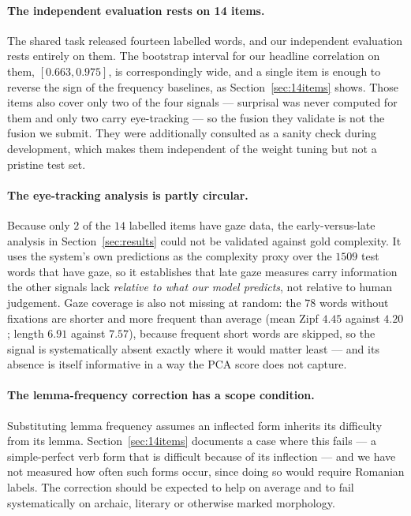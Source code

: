 \paragraph{The independent evaluation rests on 14 items.}
The shared task released fourteen labelled words, and our independent
evaluation rests entirely on them. The bootstrap interval for our headline
correlation on them, $[0.663, 0.975]$, is correspondingly wide, and a
single item is enough to reverse the sign of the frequency baselines,
as Section~\ref{sec:14items} shows. Those items also cover only two of
the four signals --- surprisal was never computed for them and only two
carry eye-tracking --- so the fusion they validate is not the fusion we
submit. They were additionally consulted as a sanity check during
development, which makes them independent of the weight tuning but not
a pristine test set.

\paragraph{The eye-tracking analysis is partly circular.}
Because only $2$ of the $14$ labelled items have gaze data, the
early-versus-late analysis in Section~\ref{sec:results} could not be
validated against gold complexity. It uses the system's own predictions
as the complexity proxy over the $1509$ test words that have gaze, so
it establishes that late gaze measures carry information the other
signals lack \emph{relative to what our model predicts}, not relative
to human judgement. Gaze coverage is also not missing at random: the
$78$ words without fixations are shorter and more frequent than
average (mean Zipf $4.45$ against $4.20$; length $6.91$ against
$7.57$), because frequent short words are skipped, so the signal is
systematically absent exactly where it would matter least --- and its
absence is itself informative in a way the PCA score does not capture.

\paragraph{The lemma-frequency correction has a scope condition.}
Substituting lemma frequency assumes an inflected form inherits its
difficulty from its lemma. Section~\ref{sec:14items} documents a case
where this fails --- a simple-perfect verb form that is difficult
because of its inflection --- and we have not measured how often such
forms occur, since doing so would require Romanian labels. The
correction should be expected to help on average and to fail
systematically on archaic, literary or otherwise marked morphology.

